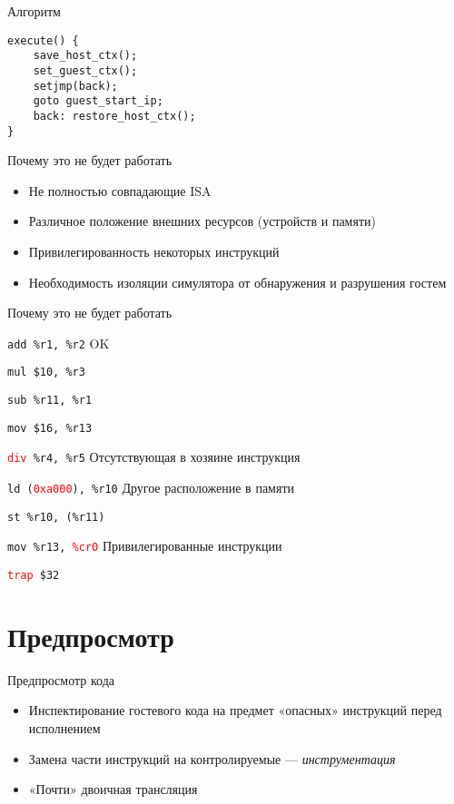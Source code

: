 \begin{frame}[fragile]{Алгоритм}
\begin{verbatim}
execute() {
    save_host_ctx();
    set_guest_ctx();
    setjmp(back);
    goto guest_start_ip;
    back: restore_host_ctx();
}
\end{verbatim}
\end{frame}

\begin{frame}{Почему это не будет работать}
\begin{itemize}
\item Не полностью совпадающие ISA
\item Различное положение внешних ресурсов (устройств и памяти)
\item Привилегированность некоторых инструкций
\item Необходимость изоляции симулятора от обнаружения и разрушения гостем
\end{itemize}
\end{frame}

\begin{frame}{Почему это не будет работать}

\texttt{add \%r1, \%r2} \hfill OK

\texttt{mul \$10, \%r3}

\texttt{sub \%r11, \%r1}

\texttt{mov \$16, \%r13}

\medskip

\texttt{\textcolor{red}{div} \%r4, \%r5} \hfill Отсутствующая в хозяине инструкция

\medskip

\texttt{ld (\textcolor{red}{0xa000}), \%r10} \hfill Другое расположение в памяти

\texttt{st \%r10, (\%r11)}

\medskip

\texttt{mov \%r13, \textcolor{red}{\%cr0}} \hfill Привилегированные инструкции

\texttt{\textcolor{red}{trap} \$32}

\end{frame}

\section{Предпросмотр}

\begin{frame}{Предпросмотр кода}

\begin{itemize}
\item Инспектирование гостевого кода на предмет «опасных» инструкций перед исполнением
\item Замена части инструкций на контролируемые — \textit{инструментация}
\item «Почти» двоичная трансляция
\end{itemize}

\end{frame}



